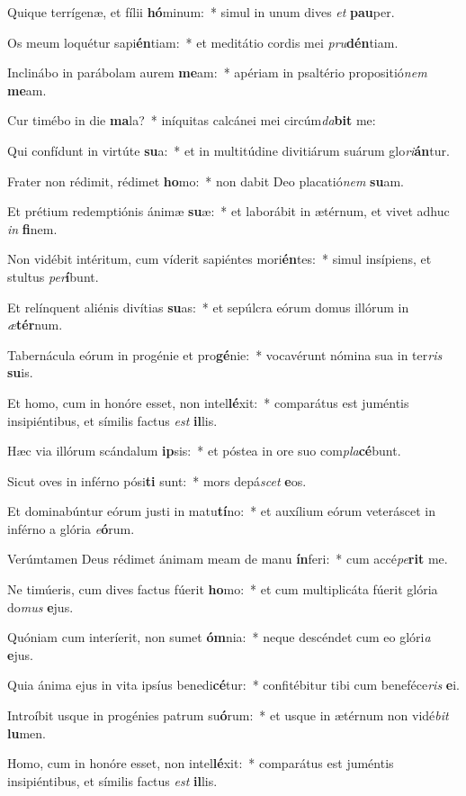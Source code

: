 \item Quique terrígenæ, et fílii \textbf{hó}minum:~* simul in unum dives \textit{et} \textbf{pau}per.
\item Os meum loquétur sapi\textbf{én}tiam:~* et meditátio cordis mei \textit{pru}\textbf{dén}tiam.
\item Inclinábo in parábolam aurem \textbf{me}am:~* apériam in psaltério propositió\textit{nem} \textbf{me}am.
\item Cur timébo in die \textbf{ma}la?~* iníquitas calcánei mei circúm\textit{da}\textbf{bit} me:
\item Qui confídunt in virtúte \textbf{su}a:~* et in multitúdine divitiárum suárum glo\textit{ri}\textbf{án}tur.
\item Frater non rédimit, rédimet \textbf{ho}mo:~* non dabit Deo placatió\textit{nem} \textbf{su}am.
\item Et prétium redemptiónis ánimæ \textbf{su}æ:~* et laborábit in ætérnum, et vivet adhuc \textit{in} \textbf{fi}nem.
\item Non vidébit intéritum, cum víderit sapiéntes mori\textbf{én}tes:~* simul insípiens, et stultus \textit{per}\textbf{í}bunt.
\item Et relínquent aliénis divítias \textbf{su}as:~* et sepúlcra eórum domus illórum in \textit{æ}\textbf{tér}num.
\item Tabernácula eórum in progénie et pro\textbf{gé}nie:~* vocavérunt nómina sua in ter\textit{ris} \textbf{su}is.
\item Et homo, cum in honóre esset, non intel\textbf{lé}xit:~* comparátus est juméntis insipiéntibus, et símilis factus \textit{est} \textbf{il}lis.
\item Hæc via illórum scándalum \textbf{ip}sis:~* et póstea in ore suo com\textit{pla}\textbf{cé}bunt.
\item Sicut oves in inférno pósi\textbf{ti} sunt:~* mors depá\textit{scet} \textbf{e}os.
\item Et dominabúntur eórum justi in matu\textbf{tí}no:~* et auxílium eórum veteráscet in inférno a glória \textit{e}\textbf{ó}rum.
\item Verúmtamen Deus rédimet ánimam meam de manu \textbf{ín}feri:~* cum accé\textit{pe}\textbf{rit} me.
\item Ne timúeris, cum dives factus fúerit \textbf{ho}mo:~* et cum multiplicáta fúerit glória do\textit{mus} \textbf{e}jus.
\item Quóniam cum interíerit, non sumet \textbf{óm}nia:~* neque descéndet cum eo glóri\textit{a} \textbf{e}jus.
\item Quia ánima ejus in vita ipsíus benedi\textbf{cé}tur:~* confitébitur tibi cum beneféce\textit{ris} \textbf{e}i.
\item Introíbit usque in progénies patrum su\textbf{ó}rum:~* et usque in ætérnum non vidé\textit{bit} \textbf{lu}men.
\item Homo, cum in honóre esset, non intel\textbf{lé}xit:~* comparátus est juméntis insipiéntibus, et símilis factus \textit{est} \textbf{il}lis.
